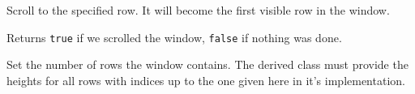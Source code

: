 \label{wxvarvscrollhelperscrolltorow}


Scroll to the specified row. It will become the first visible row in the window.

Returns {\tt true} if we scrolled the window, {\tt false} if nothing was done.


\label{wxvarvscrollhelpersetrowcount}


Set the number of rows the window contains. The derived class must provide the
heights for all rows with indices up to the one given here in it's
 implementation.



